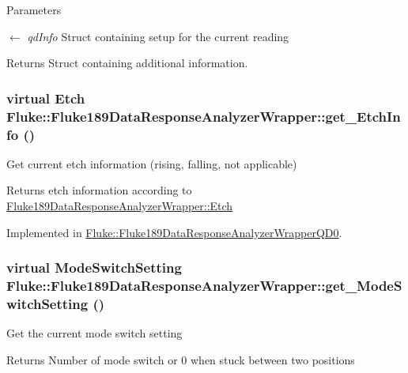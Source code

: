 \begin{DoxyParams}{Parameters}
\item[\mbox{$\leftarrow$} {\em qdInfo}]Struct containing setup for the current reading \end{DoxyParams}
\begin{DoxyReturn}{Returns}
Struct containing additional information. 
\end{DoxyReturn}
\hypertarget{classFluke_1_1Fluke189DataResponseAnalyzerWrapper_a258e56c1ff27b8aae648940599d3b475}{
\subsubsection[{get\_\-EtchInfo}]{\setlength{\rightskip}{0pt plus 5cm}virtual {\bf Etch} Fluke::Fluke189DataResponseAnalyzerWrapper::get\_\-EtchInfo ()}}
\label{classFluke_1_1Fluke189DataResponseAnalyzerWrapper_a258e56c1ff27b8aae648940599d3b475}
Get current etch information (rising, falling, not applicable) \begin{DoxyReturn}{Returns}
etch information according to \hyperlink{classFluke_1_1Fluke189DataResponseAnalyzerWrapper_ada71f6ab32a7b0eb40bb0ed96d7053bc}{Fluke189DataResponseAnalyzerWrapper::Etch} 
\end{DoxyReturn}


Implemented in \hyperlink{classFluke_1_1Fluke189DataResponseAnalyzerWrapperQD0_a8a50c55ebd21461e4c934a1eb4b07641}{Fluke::Fluke189DataResponseAnalyzerWrapperQD0}.\hypertarget{classFluke_1_1Fluke189DataResponseAnalyzerWrapper_a18e1b686e50a4cc3a7023c646f66a35c}{
\subsubsection[{get\_\-ModeSwitchSetting}]{\setlength{\rightskip}{0pt plus 5cm}virtual {\bf ModeSwitchSetting} Fluke::Fluke189DataResponseAnalyzerWrapper::get\_\-ModeSwitchSetting ()}}
\label{classFluke_1_1Fluke189DataResponseAnalyzerWrapper_a18e1b686e50a4cc3a7023c646f66a35c}
Get the current mode switch setting \begin{DoxyReturn}{Returns}
Number of mode switch or 0 when stuck between two positions 
\end{DoxyReturn}



